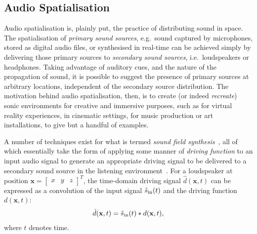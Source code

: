 \subsection{Audio Spatialisation}\label{subsec:audio-spatialisation}

Audio spatialisation is, plainly put, the practice of distributing sound in
space.
The spatialisation of \textit{primary sound sources}, e.g.\ sound
captured by microphones, stored as digital audio files, or synthesised in
real-time can be achieved simply by delivering those primary sources to
\textit{secondary sound sources}, i.e.\ loudspeakers or headphones.
Taking advantage of auditory cues, and the nature of the propagation of sound,
it is possible to suggest the presence of primary sources at arbitrary
locations, independent of the secondary source distribution.
The motivation behind audio spatialisation, then, is to create (or indeed
\textit{recreate}) sonic environments for creative and immersive purposes, such
as for virtual reality experiences, in cinematic settings, for music production
or art installations, to give but a handful of examples.

A number of techniques exist for what is termed \textit{sound field
synthesis}~\citep{ahrens_analytic_2012,nicol_sound_2017}, all of which
essentially take the form of applying some manner of \textit{driving function}
to an input audio signal to generate an appropriate driving signal to be
delivered to a secondary sound source in the listening
environment~\citep{ahrens_analytic_2012}.
For a loudspeaker at position $\mathbf{x} = \begin{bmatrix}
                                                x & y & z
\end{bmatrix}^T$, the time-domain driving signal $\hat{d}(\mathbf{x},t)$
can be expressed as a convolution of the input signal $\hat{s}_{\text{in}}(t)$ and the
driving function $d(\mathbf{x},t)$:
\begin{equation}
    \label{eq:driving-signal-time}
    \hat{d}(\mathbf{x},t) = \hat{s}_{\text{in}}(t) \ast d(\mathbf{x},t),
\end{equation}
where $t$ denotes time.


